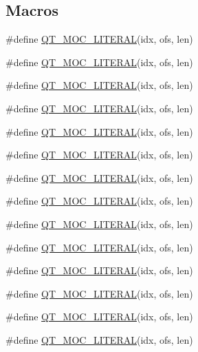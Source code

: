 \subsection*{Macros}
\begin{DoxyCompactItemize}
\item 
\#define \hyperlink{a00016_a75bb9482d242cde0a06c9dbdc6b83abe}{Q\+T\+\_\+\+M\+O\+C\+\_\+\+L\+I\+T\+E\+R\+A\+L}(idx, ofs, len)
\item 
\#define \hyperlink{a00016_a75bb9482d242cde0a06c9dbdc6b83abe}{Q\+T\+\_\+\+M\+O\+C\+\_\+\+L\+I\+T\+E\+R\+A\+L}(idx, ofs, len)
\item 
\#define \hyperlink{a00016_a75bb9482d242cde0a06c9dbdc6b83abe}{Q\+T\+\_\+\+M\+O\+C\+\_\+\+L\+I\+T\+E\+R\+A\+L}(idx, ofs, len)
\item 
\#define \hyperlink{a00016_a75bb9482d242cde0a06c9dbdc6b83abe}{Q\+T\+\_\+\+M\+O\+C\+\_\+\+L\+I\+T\+E\+R\+A\+L}(idx, ofs, len)
\item 
\#define \hyperlink{a00016_a75bb9482d242cde0a06c9dbdc6b83abe}{Q\+T\+\_\+\+M\+O\+C\+\_\+\+L\+I\+T\+E\+R\+A\+L}(idx, ofs, len)
\item 
\#define \hyperlink{a00016_a75bb9482d242cde0a06c9dbdc6b83abe}{Q\+T\+\_\+\+M\+O\+C\+\_\+\+L\+I\+T\+E\+R\+A\+L}(idx, ofs, len)
\item 
\#define \hyperlink{a00016_a75bb9482d242cde0a06c9dbdc6b83abe}{Q\+T\+\_\+\+M\+O\+C\+\_\+\+L\+I\+T\+E\+R\+A\+L}(idx, ofs, len)
\item 
\#define \hyperlink{a00016_a75bb9482d242cde0a06c9dbdc6b83abe}{Q\+T\+\_\+\+M\+O\+C\+\_\+\+L\+I\+T\+E\+R\+A\+L}(idx, ofs, len)
\item 
\#define \hyperlink{a00016_a75bb9482d242cde0a06c9dbdc6b83abe}{Q\+T\+\_\+\+M\+O\+C\+\_\+\+L\+I\+T\+E\+R\+A\+L}(idx, ofs, len)
\item 
\#define \hyperlink{a00016_a75bb9482d242cde0a06c9dbdc6b83abe}{Q\+T\+\_\+\+M\+O\+C\+\_\+\+L\+I\+T\+E\+R\+A\+L}(idx, ofs, len)
\item 
\#define \hyperlink{a00016_a75bb9482d242cde0a06c9dbdc6b83abe}{Q\+T\+\_\+\+M\+O\+C\+\_\+\+L\+I\+T\+E\+R\+A\+L}(idx, ofs, len)
\item 
\#define \hyperlink{a00016_a75bb9482d242cde0a06c9dbdc6b83abe}{Q\+T\+\_\+\+M\+O\+C\+\_\+\+L\+I\+T\+E\+R\+A\+L}(idx, ofs, len)
\item 
\#define \hyperlink{a00016_a75bb9482d242cde0a06c9dbdc6b83abe}{Q\+T\+\_\+\+M\+O\+C\+\_\+\+L\+I\+T\+E\+R\+A\+L}(idx, ofs, len)
\item 
\#define \hyperlink{a00016_a75bb9482d242cde0a06c9dbdc6b83abe}{Q\+T\+\_\+\+M\+O\+C\+\_\+\+L\+I\+T\+E\+R\+A\+L}(idx, ofs, len)

\end{DoxyCompactItemize}

